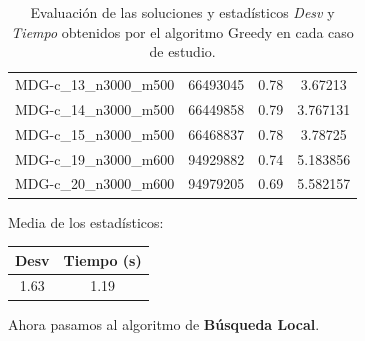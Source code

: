 \documentclass{article}
\begin{document}
\begin{table}[H]
\begin{tabular}{|cccc|}
		MDG-c\_13\_n3000\_m500 & 66493045 & 0.78 & 3.67213\\
		MDG-c\_14\_n3000\_m500 & 66449858 & 0.79 & 3.767131\\
		MDG-c\_15\_n3000\_m500 & 66468837 & 0.78 & 3.78725\\
		MDG-c\_19\_n3000\_m600 & 94929882 & 0.74 & 5.183856\\
		MDG-c\_20\_n3000\_m600 & 94979205 & 0.69 & 5.582157\\
		\hline
	\end{tabular}
	\caption{Evaluación de las soluciones y estadísticos \emph{Desv} y \emph{Tiempo} obtenidos por el algoritmo Greedy
		en cada caso de estudio.}
	\label{tab:greedy}
\end{table}

Media de los estadísticos:
\begin{table}[H]
	\centering
	\begin{tabular}{|cc|}
		\hline
		Desv & Tiempo (s)\\ \hline
		1.63 & 1.19 \\
		\hline
	\end{tabular}
\end{table}

\pagebreak

Ahora pasamos al algoritmo de \textbf{Búsqueda Local}.
\end{document}
